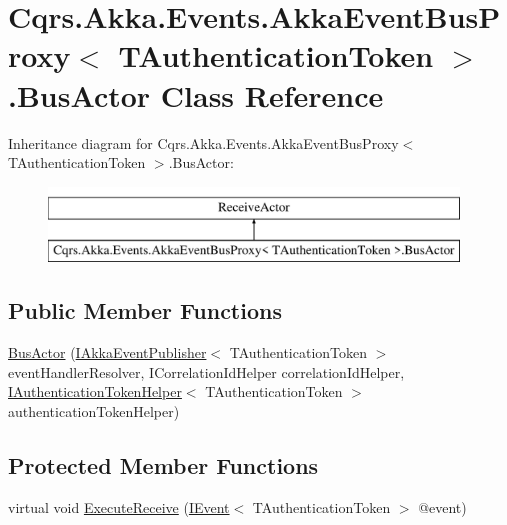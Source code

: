 \hypertarget{classCqrs_1_1Akka_1_1Events_1_1AkkaEventBusProxy_1_1BusActor}{}\section{Cqrs.\+Akka.\+Events.\+Akka\+Event\+Bus\+Proxy$<$ T\+Authentication\+Token $>$.Bus\+Actor Class Reference}
\label{classCqrs_1_1Akka_1_1Events_1_1AkkaEventBusProxy_1_1BusActor}
Inheritance diagram for Cqrs.\+Akka.\+Events.\+Akka\+Event\+Bus\+Proxy$<$ T\+Authentication\+Token $>$.Bus\+Actor\+:\begin{figure}[H]
\begin{center}
\leavevmode
\includegraphics[height=2.000000cm]{classCqrs_1_1Akka_1_1Events_1_1AkkaEventBusProxy_1_1BusActor}
\end{center}
\end{figure}
\subsection*{Public Member Functions}
\begin{DoxyCompactItemize}
\item 
\hyperlink{classCqrs_1_1Akka_1_1Events_1_1AkkaEventBusProxy_1_1BusActor_aeb7cebaad75d810375d0adb82848974a_aeb7cebaad75d810375d0adb82848974a}{Bus\+Actor} (\hyperlink{interfaceCqrs_1_1Akka_1_1Events_1_1IAkkaEventPublisher}{I\+Akka\+Event\+Publisher}$<$ T\+Authentication\+Token $>$ event\+Handler\+Resolver, I\+Correlation\+Id\+Helper correlation\+Id\+Helper, \hyperlink{interfaceCqrs_1_1Authentication_1_1IAuthenticationTokenHelper}{I\+Authentication\+Token\+Helper}$<$ T\+Authentication\+Token $>$ authentication\+Token\+Helper)
\end{DoxyCompactItemize}
\subsection*{Protected Member Functions}
\begin{DoxyCompactItemize}
\item 
virtual void \hyperlink{classCqrs_1_1Akka_1_1Events_1_1AkkaEventBusProxy_1_1BusActor_a90a6f4b440d2e2d9b997f6280ce67921_a90a6f4b440d2e2d9b997f6280ce67921}{Execute\+Receive} (\hyperlink{interfaceCqrs_1_1Events_1_1IEvent}{I\+Event}$<$ T\+Authentication\+Token $>$ @event)
\end{DoxyCompactItemize}
